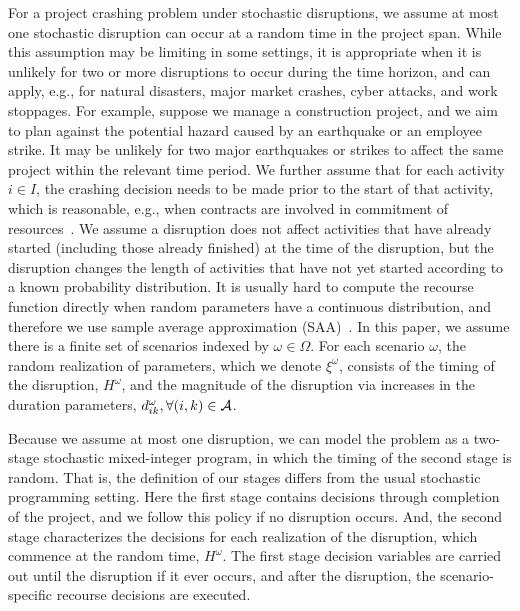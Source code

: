\documentclass[11pt]{article}
\newcommand{\cA}{{\cal A}}
\begin{document}
	For a project crashing problem under stochastic disruptions, we assume at most one stochastic disruption can occur at a random time in the project span. While this assumption may be limiting in some settings, it is appropriate when it is unlikely for two or more disruptions to occur during the time horizon, and can apply, e.g., for natural disasters, major market crashes, cyber attacks, and work stoppages. For example, suppose we manage a construction project, and we aim to plan against the potential hazard caused by an earthquake or an employee strike. It may be unlikely for two major earthquakes or strikes to affect the same project within the relevant time period. We further assume that for each activity \(i \in I\), the crashing decision needs to be made prior to the start of that activity, which is reasonable, e.g., when contracts are involved in commitment of resources~\citep{oberlender1993project}. We assume a disruption does not affect activities that have already started (including those already finished) at the time of the disruption, but the disruption changes the length of activities that have not yet started according to a known probability distribution. It is usually hard to compute the recourse function directly when random parameters have a continuous distribution, and therefore we use sample average approximation (SAA)~\citep{kim2015guide,shapiro2009lectures}. In this paper, we assume there is a finite set of scenarios indexed by \(\omega \in \Omega\). For each scenario \(\omega\), the random realization of parameters, which we denote \(\xi^\omega\), consists of the timing of the disruption, \(H^\omega\), and the magnitude of the disruption via increases in the duration parameters, \(d^\omega_{ik}, \forall (i,k) \in \cA\). 

	Because we assume at most one disruption, we can model the problem as a two-stage stochastic mixed-integer program, in which the timing of the second stage is random. That is, the definition of our stages differs from the usual stochastic programming setting. Here the first stage contains decisions through completion of the project, and we follow this policy if no disruption occurs. And, the second stage characterizes the decisions for each realization of the disruption, which commence at the random time, $H^\omega$. The first stage decision variables are carried out until the disruption if it ever occurs, and after the disruption, the scenario-specific recourse decisions are executed.
	
\end{document}
